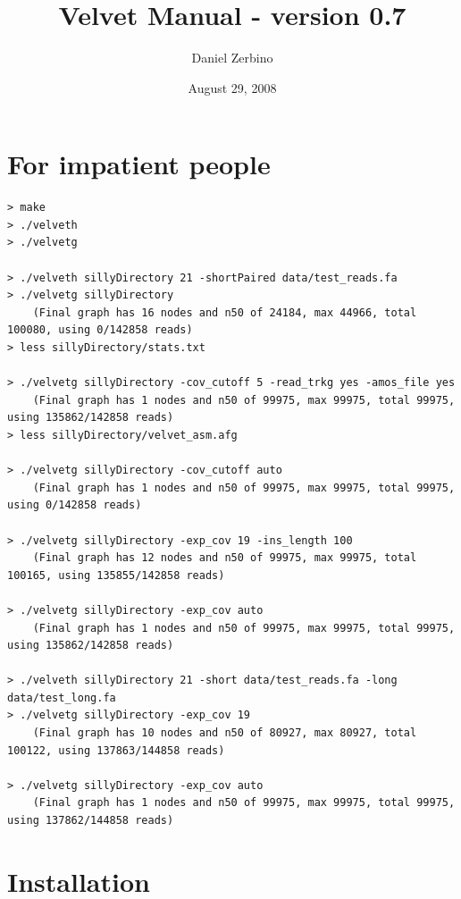 \documentclass{article}
\begin{document}
\title{Velvet Manual - version 0.7}
\author{Daniel Zerbino}
\date{August 29, 2008}


\maketitle

\tableofcontents

\newpage

\section{For impatient people}

\begin{verbatim}
> make
> ./velveth
> ./velvetg

> ./velveth sillyDirectory 21 -shortPaired data/test_reads.fa
> ./velvetg sillyDirectory
	(Final graph has 16 nodes and n50 of 24184, max 44966, total 100080, using 0/142858 reads)
> less sillyDirectory/stats.txt

> ./velvetg sillyDirectory -cov_cutoff 5 -read_trkg yes -amos_file yes
	(Final graph has 1 nodes and n50 of 99975, max 99975, total 99975, using 135862/142858 reads)
> less sillyDirectory/velvet_asm.afg

> ./velvetg sillyDirectory -cov_cutoff auto
	(Final graph has 1 nodes and n50 of 99975, max 99975, total 99975, using 0/142858 reads)

> ./velvetg sillyDirectory -exp_cov 19 -ins_length 100
	(Final graph has 12 nodes and n50 of 99975, max 99975, total 100165, using 135855/142858 reads)
	
> ./velvetg sillyDirectory -exp_cov auto
	(Final graph has 1 nodes and n50 of 99975, max 99975, total 99975, using 135862/142858 reads)

> ./velveth sillyDirectory 21 -short data/test_reads.fa -long data/test_long.fa
> ./velvetg sillyDirectory -exp_cov 19
	(Final graph has 10 nodes and n50 of 80927, max 80927, total 100122, using 137863/144858 reads)
	
> ./velvetg sillyDirectory -exp_cov auto
	(Final graph has 1 nodes and n50 of 99975, max 99975, total 99975, using 137862/144858 reads)

\end{verbatim}

\section{Installation}
\end{document}
